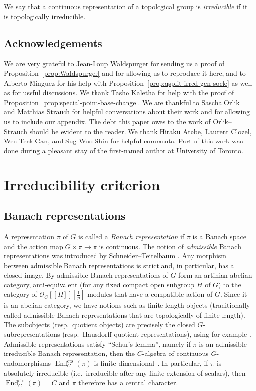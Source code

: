 \documentclass[a4paper]{amsart}
\numberwithin{equation}{section}
\theoremstyle{remark}
\theoremstyle{definition}
\DeclareMathOperator{\End}{End}
\newcommand{\cts}{\mathrm{cts}}
\begin{document}
We say that a continuous representation of a topological group is \emph{irreducible} if it is topologically irreducible.

\subsection{Acknowledgements}
\label{acknowledgements}

We are very grateful to Jean-Loup Waldspurger for sending us a proof of Proposition~\ref{prop:Waldspurger} and for allowing us to reproduce it here,
and to Alberto M\'inguez for his help with Proposition~\ref{prop:qsplit-irred-gen-socle} as well as for useful discussions.
We thank Tasho Kaletha for help with the proof of Proposition~\ref{prop:special-point-base-change}.
We are thankful to Sascha Orlik and Matthias Strauch for helpful conversations about their work and for allowing us to include our appendix.
The debt this paper owes to the work of Orlik--Strauch should be evident to the reader.
We thank Hiraku Atobe, Laurent Clozel, Wee Teck Gan, and Sug Woo Shin for helpful comments.
Part of this work was done during a pleasant stay of the first-named author at University of Toronto.

\section{Irreducibility criterion}
\label{sec:irred-crit}
\subsection{Banach representations}
\label{sec:banach-repr}
A representation $\pi$ of $G$ is called a \emph{Banach representation} if $\pi$ is a Banach space and the action map $G\times \pi\to \pi$ is continuous.
The notion of \emph{admissible} Banach representations was introduced by Schneider--Teitelbaum \cite{MR1900706}.
Any morphism between admissible Banach representations is strict and, in particular, has a closed image.
By \cite[Theorem 3.5]{MR1900706} admissible Banach representations of $G$ form an artinian abelian category, anti-equivalent (for any fixed compact open subgroup $H$ of $G$) to the category of $\mathcal O_C[[H]][\frac 1p]$-modules that have a compatible action of $G$.
Since it is an abelian category, we have notions such as finite length objects (traditionally called admissible Banach representations that are topologically of finite length).
The subobjects (resp.\ quotient objects) are precisely the closed $G$-subrepresentations (resp.\ Hausdorff quotient representations), using for example \cite[Proposition 1.3]{MR1900706}.
Admissible representations satisfy ``Schur's lemma'', namely if $\pi$ is an admissible irreducible Banach representation, then the $C$-algebra of continuous $G$-endomorphisms $\End_{G}^{\cts}(\pi)$ is finite-dimensional~\cite[Theorem~1.1]{MR3053464}.
In particular, if $\pi$ is absolutely irreducible (i.e.\ irreducible after any finite extension of scalars), then $\End_{G}^{\cts}(\pi)= C$ and $\pi$ therefore has a central character.
\end{document}

